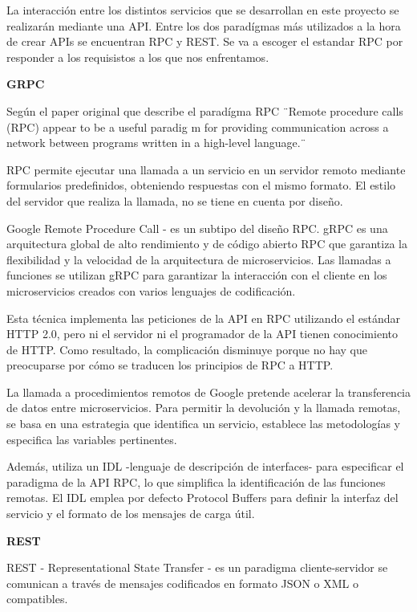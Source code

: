 
La interacción entre los distintos servicios que se desarrollan en este proyecto se realizarán mediante una API. Entre los dos paradígmas más utilizados a la hora de crear APIs se encuentran RPC y REST. Se va a escoger el estandar RPC por responder a los requisistos a los que nos enfrentamos.

\textbf{GRPC}

Según el paper original que describe el paradígma RPC ¨Remote procedure calls (RPC) appear to be a useful paradig m for providing communication across a
network between programs written in a high-level language.¨ \cite{Birrell198439}

RPC permite ejecutar una llamada a un servicio en un servidor remoto mediante formularios predefinidos, obteniendo respuestas con el mismo formato. El estilo del servidor que realiza la llamada, no se tiene en cuenta por diseño.

Google Remote Procedure Call \cite{grpc} - es un subtipo del diseño RPC. gRPC es una arquitectura global de alto rendimiento y de código abierto RPC que garantiza la flexibilidad y la velocidad de la arquitectura de microservicios. Las llamadas a funciones se utilizan gRPC para garantizar la interacción con el cliente en los microservicios creados con varios lenguajes de codificación.

Esta técnica implementa las peticiones de la API en RPC utilizando el estándar HTTP 2.0, pero ni el servidor ni el programador de la API tienen conocimiento de HTTP. Como resultado, la complicación disminuye porque no hay que preocuparse por cómo se traducen los principios de RPC a HTTP.

La llamada a procedimientos remotos de Google pretende acelerar la transferencia de datos entre microservicios. Para permitir la devolución y la llamada remotas, se basa en una estrategia que identifica un servicio, establece las metodologías y especifica las variables pertinentes.

Además, utiliza un IDL -lenguaje de descripción de interfaces- para especificar el paradigma de la API RPC, lo que simplifica la identificación de las funciones remotas. El IDL emplea por defecto Protocol Buffers para definir la interfaz del servicio y el formato de los mensajes de carga útil.

\textbf{REST}

REST - Representational State Transfer - es un paradigma cliente-servidor se comunican a través de mensajes codificados en formato JSON o XML o compatibles.

